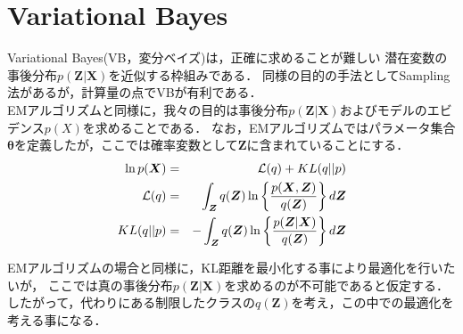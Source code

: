 %
%

\section{Variational  Bayes}
\label{sec:vb}

\def\cL{{\cal L}}
\def\tp{\tilde{p}}

Variational Bayes(VB，変分ベイズ)は，正確に求めることが難しい
潜在変数の事後分布$p(\bm Z|\bm X)$を近似する枠組みである．
同様の目的の手法としてSampling法があるが，計算量の点でVBが有利である．
\\

EMアルゴリズムと同様に，我々の目的は事後分布$p(\bm Z| \bm X)$およびモデルのエビデンス$p(X)$を求めることである．
なお，EMアルゴリズムではパラメータ集合$\bm \theta$を定義したが，ここでは確率変数として$\bm Z$に含まれていることにする．
\begin{eqnarray}
  \ln p(\bm X) &=& \cL(q) + KL(q || p) \\
  \cL(q) &=& \int_{\bm Z}q(\bm Z)\ln\left\{\frac{p(\bm X,\bm Z )}{q(\bm Z)}\right\} d \bm Z\\
  KL(q||p) &=& - \int_{\bm Z}q(\bm Z) \ln\left\{\frac{p(\bm Z | \bm X)}{q(\bm Z)}\right\} d \bm Z
\end{eqnarray}

EMアルゴリズムの場合と同様に，KL距離を最小化する事により最適化を行いたいが，
ここでは真の事後分布$p(\bm Z | \bm X)$を求めるのが不可能であると仮定する．
したがって，代わりにある制限したクラスの$q(\bm Z)$を考え，この中での最適化を考える事になる．

